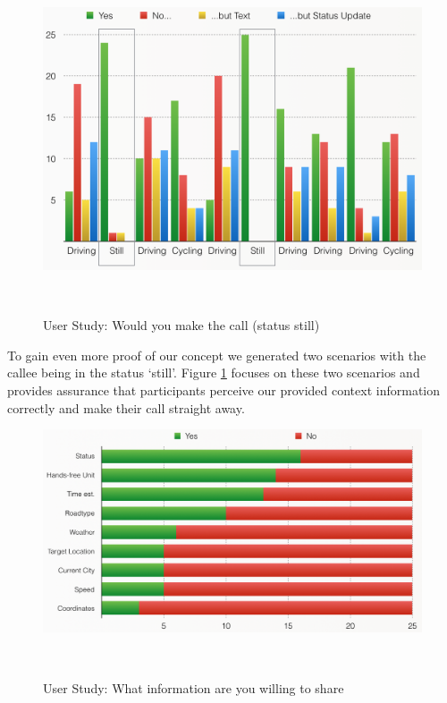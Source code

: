\documentclass{sigchi}
\begin{document}
\begin{figure}[H]
\centering
  \includegraphics[width=0.9\columnwidth]{figures/WouldYouCall_3}
  \caption{User Study: Would you make the call (status still)}~\label{fig:WouldYouCall_3}
\end{figure}

To gain even more proof of our concept we generated two scenarios with the callee being in the status `still'. Figure \ref{fig:WouldYouCall_3} focuses on these two scenarios and provides assurance that participants perceive our provided context information correctly and make their call straight away.

\begin{figure}[H]
\centering
  \includegraphics[width=0.9\columnwidth]{figures/WhatAreYouWillingToShare}
  \caption{User Study: What information are you willing to share}~\label{fig:WhatAreYouWillingToShare}
\end{figure}
\end{document}
